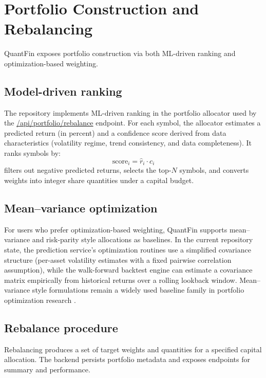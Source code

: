 \documentclass[conference]{IEEEtran}
\begin{document}
\section{Portfolio Construction and Rebalancing}\label{sec:portfolio}
QuantFin exposes portfolio construction via both ML-driven ranking and optimization-based weighting.

\subsection{Model-driven ranking}
The repository implements ML-driven ranking in the portfolio allocator used by the \url{/api/portfolio/rebalance} endpoint. For each symbol, the allocator estimates a predicted return (in percent) and a confidence score derived from data characteristics (volatility regime, trend consistency, and data completeness). It ranks symbols by:
\begin{equation}
\mathrm{score}_i = \widehat{r}_i \cdot c_i
\end{equation}
filters out negative predicted returns, selects the top-$N$ symbols, and converts weights into integer share quantities under a capital budget.

\subsection{Mean--variance optimization}
For users who prefer optimization-based weighting, QuantFin supports mean--variance and risk-parity style allocations as baselines. In the current repository state, the 
prediction service's optimization routines use a simplified covariance structure (per-asset volatility estimates with a fixed pairwise correlation assumption), while the walk-forward backtest engine can estimate a covariance matrix empirically from historical returns over a rolling lookback window. Mean--variance style formulations remain a widely used baseline family in portfolio optimization research \cite{gunjan2022portfolioreview}.

\subsection{Rebalance procedure}
Rebalancing produces a set of target weights and quantities for a specified capital allocation. The backend persists portfolio metadata and exposes endpoints for summary and performance.
\end{document}
